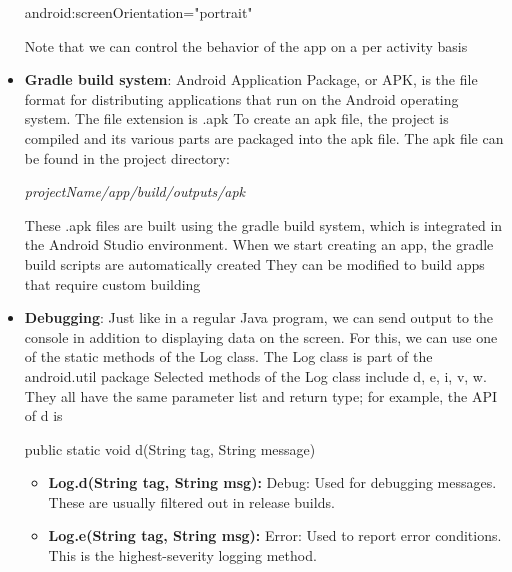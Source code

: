 \documentclass{report}
\begin{document}
\begin{itemize}
\begin{xmlcode}
            android:screenOrientation="portrait"
            \end{xmlcode}
            \bigbreak \noindent 
            Note that we can control the behavior of the app on a per activity basis
        \item \textbf{Gradle build system}: Android Application Package, or APK, is the file format for distributing applications that run on the Android operating system. 
            \bigbreak \noindent 
            The file extension is .apk
            \bigbreak \noindent 
            To create an apk file, the project is compiled and its various parts are packaged into the apk file.
            \bigbreak \noindent 
            The apk file can be found in the project directory:
            \begin{center}
                \textit{projectName/app/build/outputs/apk}
            \end{center}
            \bigbreak \noindent 
            These .apk files are built using the gradle build system, which is integrated in the Android Studio environment.
            \bigbreak \noindent 
            When we start creating an app, the gradle build scripts are automatically created
            \bigbreak \noindent 
            They can be modified to build apps that require custom building
        \item \textbf{Debugging}: Just like in a regular Java program, we can send output to the console in addition to displaying data on the screen.
            \bigbreak \noindent 
             For this, we can use one of the static methods of the Log class.
             \bigbreak \noindent 
             The Log class is part of the android.util package
             \bigbreak \noindent 
             Selected methods of the Log class include d, e, i, v, w.
             \bigbreak \noindent 
             They all have the same parameter list and return type; for example, the API of d is
             \bigbreak \noindent 
             \begin{javacode}
             public static void d(String tag, String message)
             \end{javacode}
             \begin{itemize}
                 \item \textbf{Log.d(String tag, String msg):} Debug: Used for debugging messages. These are usually filtered out in release builds.
                 \item \textbf{Log.e(String tag, String msg):} Error: Used to report error conditions. This is the highest-severity logging method.

\end{itemize}
\end{itemize}
\end{document}
